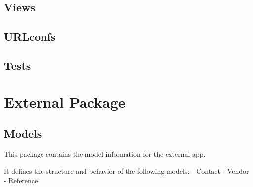 \documentclass[letterpaper,10pt,english]{sphinxmanual}
\begin{document}
\subsection{Views}
\label{api:id6}\label{api:module-experimentdb.cloning.views}

\subsection{URLconfs}
\label{api:id7}\label{api:module-experimentdb.cloning.urls}

\subsection{Tests}
\label{api:id8}

\section{External Package}
\label{api:module-experimentdb.external}\label{api:external-package}

\subsection{Models}
\label{api:id9}\label{api:module-experimentdb.external.models}
This package contains the model information for the external app.

It defines the structure and behavior of the following models:
- Contact
- Vendor
- Reference
\end{document}
